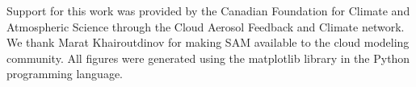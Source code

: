 \documentclass[draft,grl]{agutex}
\begin{document}
\begin{article}
%
%
%
%

\begin{acknowledgments}
Support for this work was provided by the Canadian Foundation for Climate and 
Atmospheric Science through the Cloud Aerosol Feedback and Climate network.
We thank Marat Khairoutdinov for making SAM available to the cloud modeling 
community.  All figures were generated using the matplotlib library in the 
Python programming language.
\end{acknowledgments}

%
%
%
%
%
%
%
%
%
%







\end{article}
\end{document}
